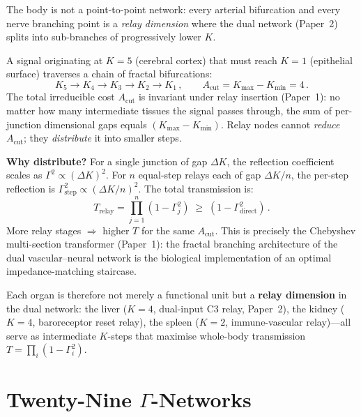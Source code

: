 \documentclass[aps,pre,twocolumn,superscriptaddress,floatfix]{revtex4-2}
\begin{document}
\begin{remark}
\label{rem:fractal-relay}
The body is not a point-to-point network:
every arterial bifurcation and every nerve
branching point is a \emph{relay dimension}
where the dual network (Paper~2) splits
into sub-branches of progressively lower $K$.

A signal originating at $K = 5$ (cerebral cortex)
that must reach $K = 1$ (epithelial surface)
traverses a chain of fractal bifurcations:
\[
  K_5 \to K_4 \to K_3 \to K_2 \to K_1\,,
  \qquad
  A_{\text{cut}} = K_{\max} - K_{\min} = 4\,.
\]
The total irreducible cost $A_{\text{cut}}$ is
invariant under relay insertion (Paper~1):
no matter how many intermediate tissues the
signal passes through, the sum of per-junction
dimensional gaps equals $(K_{\max} - K_{\min})$.
Relay nodes cannot \emph{reduce} $A_{\text{cut}}$;
they \emph{distribute} it into smaller steps.

\textbf{Why distribute?}
For a single junction of gap $\Delta K$,
the reflection coefficient scales as
$\Gamma^2 \propto (\Delta K)^2$.
For $n$ equal-step relays each of gap
$\Delta K / n$, the per-step reflection is
$\Gamma_{\text{step}}^2 \propto (\Delta K / n)^2$.
The total transmission is:
\[
  T_{\text{relay}} = \prod_{j=1}^{n}
    (1 - \Gamma_j^2) \;\ge\;
  (1 - \Gamma_{\text{direct}}^2)\,.
\]
More relay stages $\Rightarrow$ higher $T$ for
the same $A_{\text{cut}}$.
This is precisely the Chebyshev multi-section
transformer (Paper~1): the fractal branching
architecture of the dual vascular--neural network
is the biological implementation of an optimal
impedance-matching staircase.

Each organ is therefore not merely a
functional unit but a \textbf{relay dimension}
in the dual network:
the liver ($K = 4$, dual-input C3 relay,
Paper~2), the kidney ($K = 4$, baroreceptor
reset relay), the spleen ($K = 2$,
immune-vascular relay)---all serve as
intermediate $K$-steps that maximise
whole-body transmission $T = \prod_i
(1 - \Gamma_i^2)$.
\end{remark}


\section{Twenty-Nine $\Gamma$-Networks}
\label{sec:twentynine}
\end{document}
